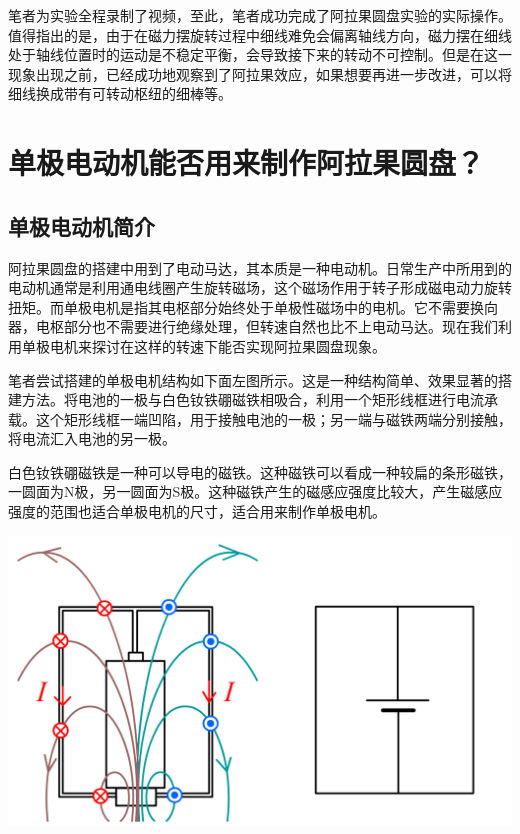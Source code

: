 \documentclass{CLGPY}
\begin{document}
\begin{multicols}{1}
笔者为实验全程录制了视频，至此，笔者成功完成了阿拉果圆盘实验的实际操作。值得指出的是，由于在磁力摆旋转过程中细线难免会偏离轴线方向，磁力摆在细线处于轴线位置时的运动是不稳定平衡，会导致接下来的转动不可控制。但是在这一现象出现之前，已经成功地观察到了阿拉果效应，如果想要再进一步改进，可以将细线换成带有可转动枢纽的细棒等。

\section{单极电动机能否用来制作阿拉果圆盘？}
\subsection{单极电动机简介}
阿拉果圆盘的搭建中用到了电动马达，其本质是一种电动机。日常生产中所用到的电动机通常是利用通电线圈产生旋转磁场，这个磁场作用于转子形成磁电动力旋转扭矩。而单极电机是指其电枢部分始终处于单极性磁场中的电机。它不需要换向器，电枢部分也不需要进行绝缘处理，但转速自然也比不上电动马达。现在我们利用单极电机来探讨在这样的转速下能否实现阿拉果圆盘现象。

笔者尝试搭建的单极电机结构如下面左图所示。这是一种结构简单、效果显著的搭建方法。将电池的一极与白色钕铁硼磁铁相吸合，利用一个矩形线框进行电流承载。这个矩形线框一端凹陷，用于接触电池的一极；另一端与磁铁两端分别接触，将电流汇入电池的另一极。

白色钕铁硼磁铁是一种可以导电的磁铁。这种磁铁可以看成一种较扁的条形磁铁，一圆面为N极，另一圆面为S极。这种磁铁产生的磁感应强度比较大，产生磁感应强度的范围也适合单极电机的尺寸，适合用来制作单极电机。
        \begin{center}
            \includegraphics[scale=.15]{./fig/20210614191454.png}
        \end{center}

\end{multicols}
\end{document}
